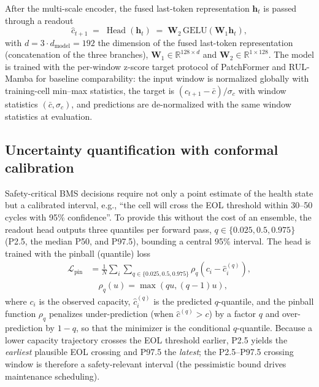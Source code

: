 \documentclass[final,5p,times,twocolumn]{elsarticle}
\begin{document}
After the multi-scale encoder, the fused last-token representation
$\mathbf{h}_{t}$ is passed through a readout
\begin{equation}
\label{eq:head}
\hat{c}_{t+1}
\;=\; \operatorname{Head}(\mathbf{h}_t)
\;=\; \mathbf{W}_2\, \mathrm{GELU}(\mathbf{W}_1 \mathbf{h}_t),
\end{equation}
with $d = 3 \cdot d_{\text{model}} = 192$ the dimension of the fused
last-token representation (concatenation of the three branches),
$\mathbf{W}_1 \in \mathbb{R}^{128 \times d}$ and
$\mathbf{W}_2 \in \mathbb{R}^{1 \times 128}$. The model is trained
with the per-window z-score target protocol of PatchFormer and
RUL-Mamba for baseline comparability: the input window is normalized
globally with training-cell min--max statistics, the target is
$(c_{t+1} - \bar{c})/\sigma_c$ with window statistics
$(\bar{c}, \sigma_c)$, and predictions are de-normalized with the
same window statistics at evaluation.

\subsection{Uncertainty quantification with conformal calibration}
\label{sec:quantile}

Safety-critical BMS decisions require not only a point estimate of
the health state but a calibrated interval, e.g., ``the cell will
cross the EOL threshold within 30--50 cycles with 95\% confidence''.
To provide this without the cost of an ensemble, the readout head
outputs three quantiles per forward pass,
$q \in \{0.025, 0.5, 0.975\}$ (P2.5, the median P50, and P97.5),
bounding a central 95\% interval. The head is trained
with the pinball (quantile) loss
\begin{equation}
\begin{split}
\mathcal{L}_{\text{pin}} &=
\frac{1}{N}\sum_{i}\sum_{q \in \{0.025,0.5,0.975\}}
\rho_q\!\left( c_i - \hat{c}_i^{(q)} \right), \\
&\quad \rho_q(u) = \max(q u, (q-1) u),
\end{split}
\end{equation}
where $c_i$ is the observed capacity, $\hat{c}_i^{(q)}$ is the
predicted $q$-quantile, and the pinball function $\rho_q$ penalizes
under-prediction (when $\hat{c}^{(q)} > c$) by a factor $q$ and
over-prediction by $1-q$, so that the minimizer is the conditional
$q$-quantile. Because a lower capacity trajectory crosses the EOL
threshold earlier, P2.5 yields the \emph{earliest} plausible EOL
crossing and P97.5 the \emph{latest}; the P2.5--P97.5 crossing
window is therefore a safety-relevant interval (the pessimistic
bound drives maintenance scheduling).
\end{document}
